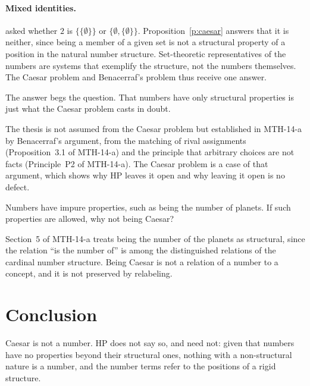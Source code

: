 \documentclass{situationist-preprint}
\begin{document}
\paragraph{Mixed identities.} \citet{Benacerraf1965} asked whether $2$ is $\{\{\emptyset\}\}$ or $\{\emptyset, \{\emptyset\}\}$. Proposition~\ref{p:caesar} answers that it is neither, since being a member of a given set is not a structural property of a position in the natural number structure. Set-theoretic representatives of the numbers are systems that exemplify the structure, not the numbers themselves. The Caesar problem and Benacerraf's problem thus receive one answer.

\begin{objection}
The answer begs the question. That numbers have only structural properties is just what the Caesar problem casts in doubt.
\end{objection}

\begin{reply}
The thesis is not assumed from the Caesar problem but established in MTH-14-a by Benacerraf's argument, from the matching of rival assignments (Proposition~3.1 of MTH-14-a) and the principle that arbitrary choices are not facts (Principle~P2 of MTH-14-a). The Caesar problem is a case of that argument, which shows why HP leaves it open and why leaving it open is no defect.
\end{reply}

\begin{objection}
Numbers have impure properties, such as being the number of planets. If such properties are allowed, why not being Caesar?
\end{objection}

\begin{reply}
Section~5 of MTH-14-a treats being the number of the planets as structural, since the relation \enquote{is the number of} is among the distinguished relations of the cardinal number structure. Being Caesar is not a relation of a number to a concept, and it is not preserved by relabeling.
\end{reply}

\section{Conclusion}

Caesar is not a number. HP does not say so, and need not: given that numbers have no properties beyond their structural ones, nothing with a non-structural nature is a number, and the number terms refer to the positions of a rigid structure.
\end{document}
